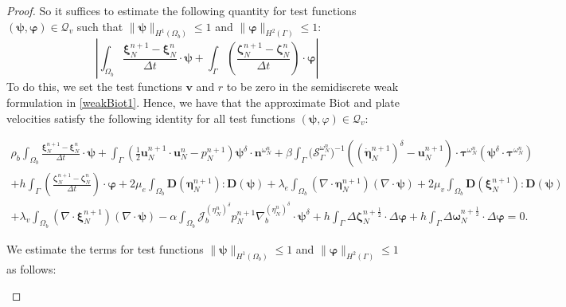 \documentclass[11pt]{article}
\newcommand{\bd}{\boldsymbol}
\theoremstyle{definition}
\begin{document}
\begin{proof}
So it suffices to estimate the following quantity for test functions $(\bd{\psi}, \bd{\varphi}) \in \mathcal{Q}_{v}$ such that $\|\bd{\psi}\|_{H^{1}(\Omega_{b})} \le 1$ and $\|\bd{\varphi}\|_{H^{2}(\Gamma)} \le 1$:
\begin{equation*}
\left|\int_{\Omega_{b}} \frac{\bd{\xi}^{n + 1}_{N} - \bd{\xi}^{n}_{N}}{\Delta t} \cdot \bd{\psi} + \int_{\Gamma} \left(\frac{\bd{\zeta}^{n + 1}_{N} - \bd{\zeta}^{n}_{N}}{\Delta t}\right) \cdot \bd{\varphi}\right|
\end{equation*}
To do this, we set the test functions $\bd{v}$ and $r$ to be zero in the semidiscrete weak formulation in \eqref{weakBiot1}. Hence, we have that the approximate Biot and plate velocities satisfy the following identity for all test functions $(\bd{\psi}, \varphi) \in \mathcal{Q}_{v}$:
\begin{small}
\begin{multline*}
\rho_{b} \int_{\Omega_{b}} \frac{\bd{\xi}^{n + 1}_{N} - \bd{\xi}^{n}_{N}}{\Delta t} \cdot \bd{\psi} + \int_{\Gamma} \left(\frac{1}{2}\bd{u}^{n + 1}_{N} \cdot \bd{u}^{n}_{N} - p^{n + 1}_{N}\right) \bd{\psi}^{\delta} \cdot \bd{n}^{\omega^{n}_{N}} + \beta \int_{\Gamma} \Big(\mathcal{S}^{\omega^{n}_{N}}_{\Gamma}\Big)^{-1} \left(\left(\dot{\bd{\eta}}^{n + 1}_{N}\right)^{\delta} - \bd{u}^{n + 1}_{N}\right) \cdot \bd{\tau}^{\omega^{n}_{N}} \left(\bd{\psi}^{\delta} \cdot \bd{\tau}^{\omega^{n}_{N}}\right) \\
+ h \int_{\Gamma} \left(\frac{\bd{\zeta}^{n + 1}_{N} - \bd{\zeta}^{n}_{N}}{\Delta t}\right) \cdot \bd{\varphi} + 2\mu_{e} \int_{\Omega_{b}} \bd{D}(\bd{\eta}^{n + 1}_{N}) : \bd{D}(\bd{\psi}) + \lambda_{e} \int_{\Omega_{b}} (\nabla \cdot \bd{\eta}^{n + 1}_{N}) (\nabla \cdot \bd{\psi}) + 2\mu_{v} \int_{\Omega_{b}} \bd{D}(\bd{\xi}^{n + 1}_{N}) : \bd{D}(\bd{\psi}) \\
+ \lambda_{v} \int_{\Omega_{b}} (\nabla \cdot \bd{\xi}^{n + 1}_{N}) (\nabla \cdot \bd{\psi}) - \alpha \int_{\Omega_{b}} \mathcal{J}^{(\eta^{n}_{N})^{\delta}}_{b} p^{n + 1}_{N} \nabla^{(\eta^{n}_{N})^{\delta}}_{b} \cdot \bd{\psi}^{\delta} + h \int_{\Gamma} \Delta \bd{\zeta}^{n + \frac{1}{2}}_{N} \cdot \Delta \bd{\varphi} + h \int_{\Gamma} \Delta \bd{\omega}^{n + \frac{1}{2}}_{N} \cdot \Delta \bd{\varphi} = 0.
\end{multline*}
\end{small}
We estimate the terms for test functions $\|\bd{\psi}\|_{H^{1}(\Omega_{b})} \le 1$ and $\|\bd{\varphi}\|_{H^{2}(\Gamma)} \le 1$ as follows:
\begin{itemize}

\end{itemize}
\end{proof}
\end{document}
